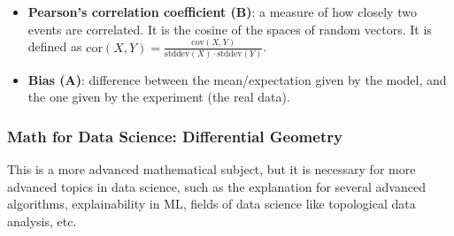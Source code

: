 \documentclass{article}
\begin{document}
\begin{itemize}
    \item \textbf{Pearson's correlation coefficient (B)}: a measure of how closely two events are correlated. It is the cosine of the spaces of random vectors. It is defined as $\text{cor}(X, Y) = \frac{\text{cov}(X, Y)}{\text{stddev}(X) \cdot \text{stddev}(Y)}$.
    
    \item \textbf{Bias (A)}: difference between the mean/expectation given by the model, and the one given by the experiment (the real data).
\end{itemize}


\subsubsection*{Math for Data Science: Differential Geometry}

This is a more advanced mathematical subject, but it is necessary for more advanced topics in data science, such as the explanation for several advanced algorithms, explainability in ML, fields of data science like topological data analysis, etc.
\end{document}
